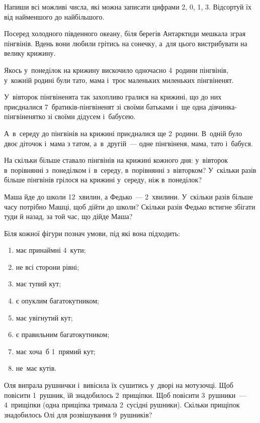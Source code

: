 \problem
Напиши всі можливі числа, які можна записати цифрами 2, 0, 1, 3.
Відсортуй їх від найменшого до найбільшого.


\problem
Посеред холодного південного океану, біля берегів Антарктиди мешкала
зграя пінгвінів. Вдень вони любили грітись на сонечку, а~для цього
вистрибувати на велику крижину.

Якось у~понеділок на крижину вискочило одночасно 4~родини пінгвінів,
у~кожній родині були тато, мама і~троє маленьких миленьких пінгвіненят.

У~вівторок пінгвіненята так захопливо гралися на крижині,
що до них приєдналися 7~братиків-пінгвіненят зі своїми батьками
і~ще одна дівчинка-пінгвіненятко зі своїми дідусем і~бабусею.

А~в~середу до пінгвінів на крижині приєдналися ще 2~родини.
В~одній було двоє діточок і~мама з татом, а~в~другій~--- 
одне пінгвіненя, мама, тато і~бабуся.

На скільки більше ставало пінгвінів на крижині кожного дня:
у~вівторок в~порівнянні з~понеділком і~в~середу, в~порівнянні з~вівторком?
У~скільки разів більше пінгвінів грілося на крижині у~середу, ніж в~понеділок?


\problem
Маша йде до школи 12~хвилин, а Федько~--- 2~хвилини.
У~скільки разів більше часу потрібно Машці, щоб дійти до школи?
Скільки разів Федько встигне збігати туди й назад, за той час, що дійде Маша?


\problem
{}

Біля кожної фігури познач умови, під які вона підходить:
\begin{enumerate}
    \item має принаймні 4~кути;
    \item не всі сторони рівні;
    \item має тупий кут;
    \item є опуклим багатокутником;
    \item має увігнутий кут;
    \item є правильним багатокутником;
    \item має хоча~б 1~прямий кут;
    \item не~має кутів.
\end{enumerate}


\problem
Оля випрала рушнички і~вивісила їх сушитись у~дворі на мотузочці.
Щоб повісити 1~рушник, їй знадобилось 2~прищіпки.
Щоб повісити 3~рушники~--- 4~прищіпки (одна прищіпка тримала 2~сусідні рушники).
Скільки прищіпок знадобилось Олі для розвішування 9~рушників?


